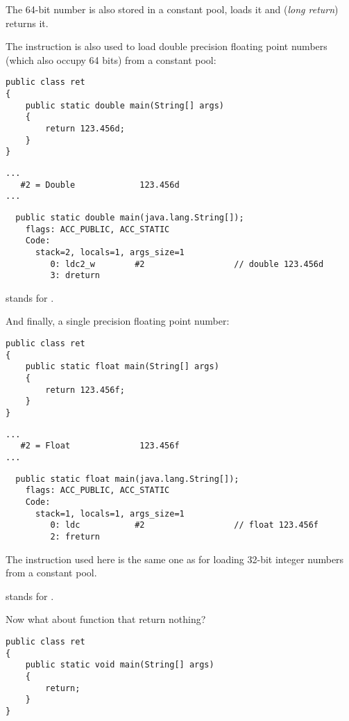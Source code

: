 The 64-bit number is also stored in a constant pool,  loads it and 
(\emph{long return}) returns it.

The  instruction is also used to load double precision floating point numbers
(which also occupy 64 bits) from a constant pool:

\begin{lstlisting}[style=customjava]
public class ret
{
	public static double main(String[] args)
	{
		return 123.456d;
	}
}
\end{lstlisting}

\begin{lstlisting}[caption=Constant pool]
...
   #2 = Double             123.456d
...
\end{lstlisting}

\begin{lstlisting}
  public static double main(java.lang.String[]);
    flags: ACC_PUBLIC, ACC_STATIC
    Code:
      stack=2, locals=1, args_size=1
         0: ldc2_w        #2                  // double 123.456d
         3: dreturn
\end{lstlisting}

 stands for .

And finally, a single precision floating point number:

\begin{lstlisting}[style=customjava]
public class ret
{
	public static float main(String[] args)
	{
		return 123.456f;
	}
}
\end{lstlisting}

\begin{lstlisting}[caption=Constant pool]
...
   #2 = Float              123.456f
...
\end{lstlisting}

\begin{lstlisting}
  public static float main(java.lang.String[]);
    flags: ACC_PUBLIC, ACC_STATIC
    Code:
      stack=1, locals=1, args_size=1
         0: ldc           #2                  // float 123.456f
         2: freturn
\end{lstlisting}

The  instruction used here is the same one as for loading 32-bit integer numbers
from a constant pool.

 stands for .

Now what about function that return nothing?

\begin{lstlisting}[style=customjava]
public class ret
{
	public static void main(String[] args)
	{
		return;
	}
}
\end{lstlisting}

